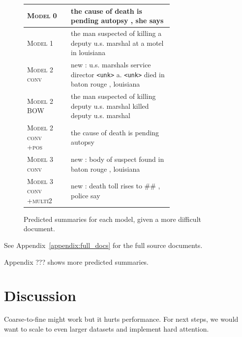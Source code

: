 \documentclass[12pt]{report}
\begin{document}
\begin{figure}[p]
\begin{tabular}{ll p{0.7\linewidth}}
\textsc{Model 0} & & the cause of death is pending autopsy , she says \\
\midrule
 \textsc{Model 1} & & the man suspected of killing a deputy u.s. marshal at a motel in louisiana \\
\midrule
\textsc{Model 2 conv} & & new : u.s. marshals service director \texttt{<unk>} a. \texttt{<unk>} died in baton rouge , louisiana \\
\textsc{Model 2 BOW} & &  the man suspected of killing deputy u.s. marshal killed deputy u.s. marshal \\
\textsc{Model 2 conv +pos} & & the cause of death is pending autopsy \\
\midrule
\textsc{Model 3 conv} & & new : body of suspect found in baton rouge , louisiana \\
\textsc{Model 3 conv +multi2} & &  new : death toll rises to \#\# , police say \\
\bottomrule
\end{tabular}
\caption{Predicted summaries for each model, given a more difficult document.}
\label{fig:predicted_summaries}
\end{figure}

See Appendix~\ref{appendix:full_docs} for the full source documents.

 Appendix ??? shows more predicted summaries.

\section{Discussion}

Coarse-to-fine might work but it hurts performance. For next steps, we would want to scale to even larger datasets and implement hard attention.
\end{document}
